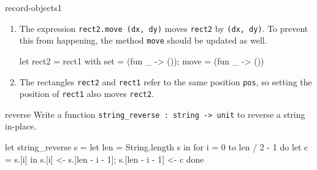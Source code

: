 \begin{exercise}{record-objects1}
\begin{answer}
\begin{enumerate}
\item
The expression \hbox{\lstinline/rect2.move (dx, dy)/} moves \hbox{\lstinline/rect2/} by \hbox{\lstinline/(dx, dy)/}.  To
prevent this from happening, the method \hbox{\lstinline/move/} should be updated as well.

\begin{ocaml}
let rect2 = { rect1 with set = (fun _ -> ()); move = (fun _ -> ()) }
\end{ocaml}

\item The rectangles \hbox{\lstinline/rect2/} and \hbox{\lstinline/rect1/} refer to the same position \hbox{\lstinline/pos/},
so setting the position of \hbox{\lstinline/rect1/} also moves \hbox{\lstinline/rect2/}.
\end{enumerate}
\fi\end{answer}
\end{exercise}

%
\begin{exercise}{reverse}
Write a function \hbox{\lstinline/string_reverse : string -> unit/} to reverse a string in-place.

\begin{answer}\ifanswers
\begin{ocaml}
let string_reverse s =
   let len = String.length s in
   for i = 0 to len / 2 - 1 do
      let c = s.[i] in
      s.[i] <- s.[len - i - 1];
      s.[len - i - 1] <- c
   done
\end{ocaml}
\fi\end{answer}
\end{exercise}

